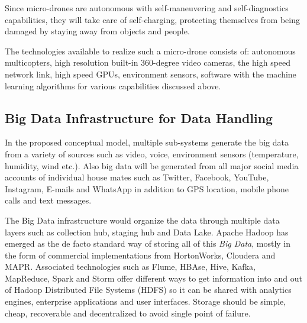 \documentclass[sigconf]{acmart}
\begin{document}
Since micro-drones are autonomous with self-maneuvering and self-diagnostics capabilities, they will take care of self-charging, protecting themselves from being damaged by staying away from objects and people.

The technologies available to realize such a micro-drone consists of: autonomous multicopters, high resolution built-in 360-degree video cameras, the high speed network link, high speed GPUs, environment sensors, software with the machine learning algorithms for various capabilities discussed above.


\subsection{Big Data Infrastructure for Data Handling }
In the proposed conceptual model, multiple sub-systems generate the big data from a variety of sources such as video, voice, environment sensors (temperature, humidity, wind etc.). Also big data will be generated from all major social media accounts of individual house mates such as Twitter, Facebook, YouTube, Instagram, E-mails and WhatsApp in addition to GPS location, mobile phone calls and text messages.

The Big Data infrastructure would organize the data through multiple data layers such as collection hub, staging hub and Data Lake. Apache Hadoop has emerged as the de facto standard way of storing all of this \textit{Big Data}, mostly in the form of commercial implementations from HortonWorks, Cloudera and MAPR. Associated technologies such as Flume, HBAse, Hive, Kafka, MapReduce, Spark and Storm offer different ways to get information into and out of Hadoop Distributed File Systems (HDFS) so it can be shared with analytics engines, enterprise applications and user interfaces. Storage should be simple, cheap, recoverable and decentralized to avoid single point of failure.
\end{document}
